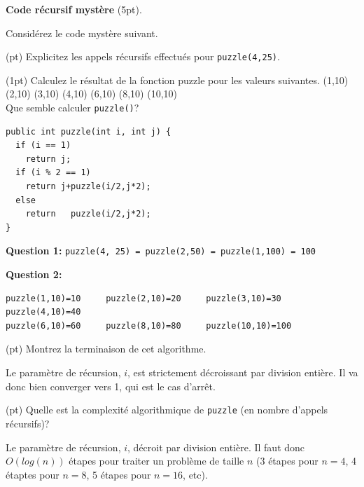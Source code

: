 \documentclass[10pt]{article}\usepackage[nu]{esial}
\begin{document}
\bigskip\Exercice\textbf{Code récursif mystère} (5pt). 

Considérez le code mystère suivant. 

\noindent\begin{minipage}{.65\linewidth}

\Question(\textonehalf pt) Explicitez les appels récursifs effectués pour 
\texttt{puzzle(4,25)}. 

\Question(1pt) Calculez le résultat de la fonction puzzle pour les
valeurs suivantes. (1,10) (2,10) (3,10) (4,10) (6,10) (8,10) (10,10)\\
Que semble calculer \texttt{puzzle()}?

\end{minipage}\hfill
\begin{minipage}{.33\linewidth}
\begin{Verbatim}[numbers=right]
public int puzzle(int i, int j) {
  if (i == 1)     
    return j;
  if (i % 2 == 1)
    return j+puzzle(i/2,j*2);
  else 
    return   puzzle(i/2,j*2);
}
\end{Verbatim}
\end{minipage}

\begin{Reponse}
\noindent\textbf{Question 1:} \texttt{puzzle(4, 25) = puzzle(2,50) =
  puzzle(1,100) = 100} 

\noindent\textbf{Question 2:} \vspace{-.8\baselineskip}
\begin{verbatim}
puzzle(1,10)=10     puzzle(2,10)=20     puzzle(3,10)=30      puzzle(4,10)=40
puzzle(6,10)=60     puzzle(8,10)=80     puzzle(10,10)=100
\end{verbatim}
\vspace{-.8\baselineskip}
\end{Reponse}

\Question(\textonehalf pt)  Montrez la terminaison de cet algorithme.

\begin{Reponse}
  Le paramètre de récursion, $i$, est strictement décroissant par division
  entière. Il va donc bien converger vers 1, qui est le cas d'arrêt.
\end{Reponse}

\Question(\textonehalf pt) Quelle est la complexité algorithmique de
\texttt{puzzle} (en nombre d'appels récursifs)? 
\begin{Reponse}
  Le paramètre de récursion, $i$, décroit par division entière. Il faut donc
  $O(log(n))$ étapes pour traiter un problème de taille $n$ (3 étapes pour
  $n=4$, 4 étaptes pour $n=8$, 5 étapes pour $n=16$, etc).
\end{Reponse}
\end{document}

